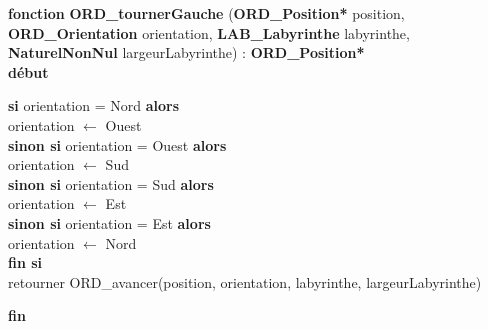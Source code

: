 \noindent\textbf{fonction} \textbf{ORD\_tournerGauche} (\textbf{ORD\_Position*} position, \textbf{ORD\_Orientation} orientation, \textbf{LAB\_Labyrinthe} labyrinthe, \textbf{NaturelNonNul} largeurLabyrinthe) : \textbf{ORD\_Position*}\\
\textbf{début}
\begin{flushleft}
    \hspace*{1cm}\textbf{si} orientation = Nord \textbf{alors}\\
    \hspace*{2cm}orientation $\gets$ Ouest\\
    \hspace*{1cm}\textbf{sinon si} orientation = Ouest \textbf{alors}\\
    \hspace*{2cm}orientation $\gets$ Sud\\
    \hspace*{1cm}\textbf{sinon si} orientation = Sud \textbf{alors}\\
    \hspace*{2cm}orientation $\gets$ Est\\
    \hspace*{1cm}\textbf{sinon si} orientation = Est \textbf{alors}\\
    \hspace*{2cm}orientation $\gets$ Nord\\
    \hspace*{1cm}\textbf{fin si}\\
    \hspace*{1cm}retourner ORD\_avancer(position, orientation, labyrinthe, largeurLabyrinthe)
\end{flushleft}
\textbf{fin}\\

